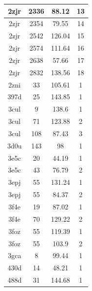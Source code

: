 \begin{center}
\begin{longtable}{c|c|c|c}
2zjr & 2336 & 88.12 & 13 \\ \hline
2zjr & 2354 & 79.55 & 14 \\ \hline
2zjr & 2542 & 126.04 & 15 \\ \hline
2zjr & 2574 & 111.64 & 16 \\ \hline
2zjr & 2638 & 57.66 & 17 \\ \hline
2zjr & 2832 & 138.56 & 18 \\ \hline
2zni & 33 & 105.61 & 1 \\ \hline
397d & 25 & 143.85 & 1 \\ \hline
3cul & 9 & 138.6 & 1 \\ \hline
3cul & 71 & 123.88 & 2 \\ \hline
3cul & 108 & 87.43 & 3 \\ \hline
3d0u & 143 & 98 & 1 \\ \hline
3e5c & 20 & 44.19 & 1 \\ \hline
3e5c & 43 & 76.79 & 2 \\ \hline
3epj & 55 & 131.24 & 1 \\ \hline
3epj & 55 & 84.37 & 2 \\ \hline
3f4e & 19 & 87.02 & 1 \\ \hline
3f4e & 70 & 129.22 & 2 \\ \hline
3foz & 55 & 119.39 & 1 \\ \hline
3foz & 55 & 103.9 & 2 \\ \hline
3gca & 8 & 99.44 & 1 \\ \hline
430d & 14 & 48.21 & 1 \\ \hline
488d & 31 & 144.68 & 1 \\ \hline
\end{longtable}
\end{center}



